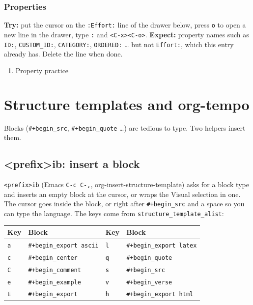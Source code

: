 \subsubsection{Properties}
\label{sec:orgefbd59a}
\textbf{Try:} put the cursor on the \texttt{:Effort:} line of the drawer below, press
\texttt{o} to open a new line in the drawer, type \texttt{:} and \texttt{<C-x><C-o>}.
\textbf{Expect:} property names such as \texttt{ID:}, \texttt{CUSTOM\_ID:}, \texttt{CATEGORY:},
\texttt{ORDERED:} \ldots{} but not \texttt{Effort:}, which this entry already has. Delete
the line when done.
\begin{enumerate}
\item Property practice
\label{sec:org38bae4b}
\end{enumerate}
\section{Structure templates and org-tempo}
\label{sec:orgc8c3ec6}
Blocks (\texttt{\#+begin\_src}, \texttt{\#+begin\_quote} \ldots{}) are tedious to type. Two
helpers insert them.
\subsection{<prefix>ib: insert a block}
\label{sec:org8457a29}
\texttt{<prefix>ib} (Emacs \texttt{C-c C-,}, org-insert-structure-template) asks for a
block type and inserts an empty block at the cursor, or wraps the Visual
selection in one. The cursor goes inside the block, or right after
\texttt{\#+begin\_src} and a space so you can type the language. The keys come from
\texttt{structure\_template\_alist}:

\begin{center}
\begin{tabular}{llll}
Key & Block & Key & Block\\
\hline
\texttt{a} & \texttt{\#+begin\_export ascii} & \texttt{l} & \texttt{\#+begin\_export latex}\\
\texttt{c} & \texttt{\#+begin\_center} & \texttt{q} & \texttt{\#+begin\_quote}\\
\texttt{C} & \texttt{\#+begin\_comment} & \texttt{s} & \texttt{\#+begin\_src}\\
\texttt{e} & \texttt{\#+begin\_example} & \texttt{v} & \texttt{\#+begin\_verse}\\
\texttt{E} & \texttt{\#+begin\_export} & \texttt{h} & \texttt{\#+begin\_export html}\\
\end{tabular}
\end{center}

